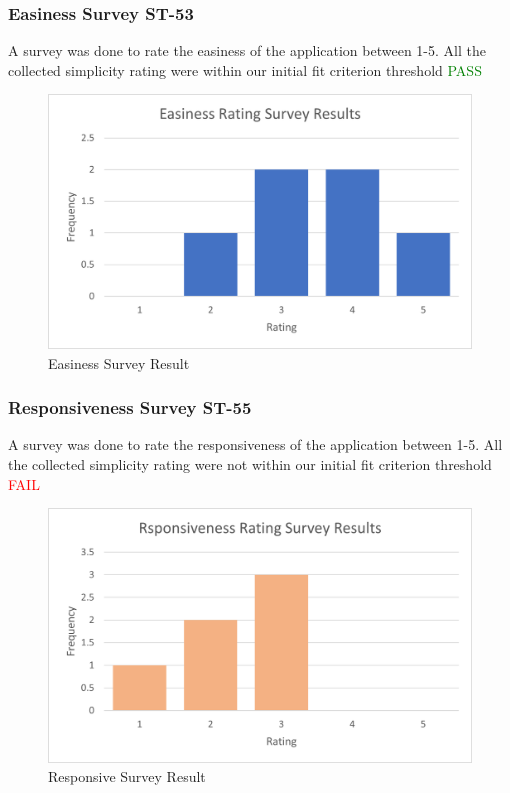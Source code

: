 \documentclass[12pt, titlepage]{article}
\begin{document}
\subsubsection{Easiness Survey ST-53}
A survey was done to rate the easiness of the application between 1-5. All the collected simplicity rating were within our initial fit criterion threshold \textcolor{green}{PASS}
\begin{figure}[H]
\centering
\includegraphics[]{easiness}
\caption{Easiness Survey Result}
\end{figure}

\subsubsection{Responsiveness Survey ST-55}
A survey was done to rate the responsiveness of the application between 1-5. All the collected simplicity rating were not within our initial fit criterion threshold \textcolor{red}{FAIL}
\begin{figure}[H]
\centering
\includegraphics[]{responsiveness}
\caption{Responsive Survey Result}
\end{figure}
\end{document}
